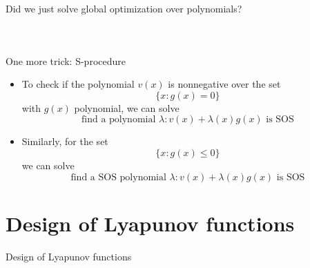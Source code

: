 \documentclass[aspectratio=169]{beamer}
\begin{document}
\begin{frame}{Did we just solve global optimization over polynomials?}
\begin{columns}
\begin{figure}
\end{figure}
\end{columns}
\end{frame}

\begin{frame}{One more trick: S-procedure}
\begin{itemize}
\item
To check if the polynomial $v(x)$ is nonnegative over the set
$$
\{ x :  g(x) = 0 \}
$$
with $g(x)$ polynomial, we can solve
$$
\text{find a polynomial } \lambda : v(x) + \lambda(x) g(x) \text{ is SOS}
$$
\item
Similarly, for the set
$$
\{ x :  g(x) \leq 0 \}
$$
we can solve
$$
\text{find a SOS polynomial } \lambda : v(x) + \lambda(x) g(x) \text{ is SOS}
$$
\end{itemize}
\end{frame}

\section{Design of Lyapunov functions}
\begin{frame}
\huge
\centering
{\color{darkred} Design of Lyapunov functions}
\end{frame}
\end{document}
